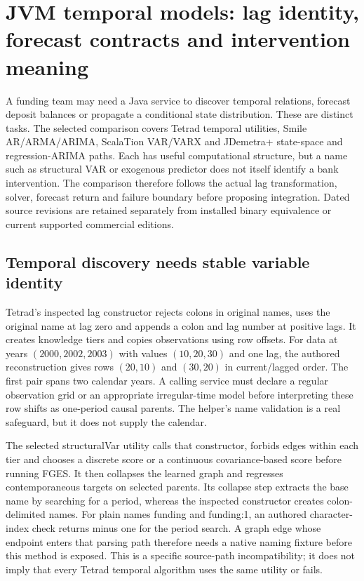 \section[JVM temporal models and inference]{JVM temporal models: lag identity, forecast contracts and intervention meaning}
\label{sec:exec25-java-dynamic}

A funding team may need a Java service to discover temporal relations, forecast deposit balances or propagate a conditional state distribution. These are distinct tasks. The selected comparison covers Tetrad temporal utilities, Smile AR/ARMA/ARIMA, ScalaTion VAR/VARX and JDemetra+ state-space and regression-ARIMA paths. Each has useful computational structure, but a name such as structural VAR or exogenous predictor does not itself identify a bank intervention. The comparison therefore follows the actual lag transformation, solver, forecast return and failure boundary before proposing integration. Dated source revisions are retained separately from installed binary equivalence or current supported commercial editions.\citep{exec25_jdyn_tetrad,exec25_jdyn_smile,exec25_jdyn_scalation,exec25_jdyn_jdplus,exec25_jdyn_choice}

\subsection{Temporal discovery needs stable variable identity}

Tetrad's inspected lag constructor rejects colons in original names, uses the original name at lag zero and appends a colon and lag number at positive lags. It creates knowledge tiers and copies observations using row offsets. For data at years $(2000,2002,2003)$ with values $(10,20,30)$ and one lag, the authored reconstruction gives rows $(20,10)$ and $(30,20)$ in current/lagged order. The first pair spans two calendar years. A calling service must declare a regular observation grid or an appropriate irregular-time model before interpreting these row shifts as one-period causal parents. The helper's name validation is a real safeguard, but it does not supply the calendar.\citep{exec25_jdyn_tetrad,exec25_jdyn_choice}

The selected structuralVar utility calls that constructor, forbids edges within each tier and chooses a discrete score or a continuous covariance-based score before running FGES. It then collapses the learned graph and regresses contemporaneous targets on selected parents. Its collapse step extracts the base name by searching for a period, whereas the inspected constructor creates colon-delimited names. For plain names funding and funding:1, an authored character-index check returns minus one for the period search. A graph edge whose endpoint enters that parsing path therefore needs a native naming fixture before this method is exposed. This is a specific source-path incompatibility; it does not imply that every Tetrad temporal algorithm uses the same utility or fails.\citep{exec25_jdyn_tetrad,exec25_jdyn_choice}


